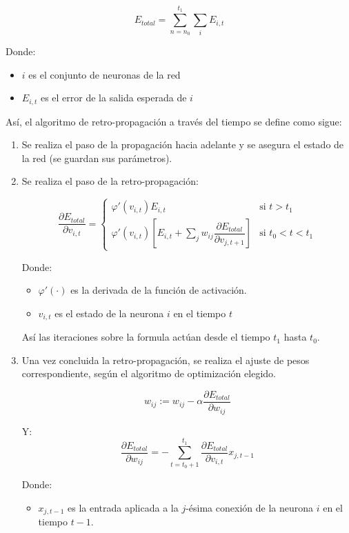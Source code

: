 \[
E_{total} = \sum^{t_1}_{n=n_0}\sum_{i}E_{i,t}
\]

Donde:
\begin{itemize}
    \item $i$ es el conjunto de neuronas de la red
    \item $E_{i,t}$ es el error de la salida esperada de $i$
\end{itemize}

Así, el algoritmo de retro-propagación a través del tiempo se define como sigue:

\begin{enumerate}
    \item Se realiza el paso de la propagación hacia adelante y se asegura el estado de la red (se guardan sus parámetros).
    \item Se realiza el paso de la retro-propagación:

    \[
    \dfrac{\partial E_{total}}{\partial v_{i,t}} = \left\{
    \begin{array}{ll}
    \varphi'(v_{i,t})E_{i,t} & \text{si } t > t_1 \\
    \varphi'(v_{i,t}) \left[E_{i,t}+\sum_{j}w_{ij}\dfrac{\partial E_{total}}{\partial v_{j,t+1}}\right] & \text{si } t_0 < t < t_1
\end{array}
\right.
    \]
    
    Donde:
    \begin{itemize}
        \item $\varphi'(\cdot)$ es la derivada de la función de activación.
        \item $v_{i,t}$ es el estado de la neurona $i$ en el tiempo $t$
    \end{itemize}

    Así las iteraciones sobre la formula actúan desde el tiempo $t_1$ hasta $t_0$.
    
    \item Una vez concluida la retro-propagación, se realiza el ajuste de pesos correspondiente, según el algoritmo de optimización elegido. 

    \[
    w_{ij} := w_{ij} - \alpha \dfrac{\partial E_{total}}{\partial w_{ij}}
    \]

    Y:
    \[
    \dfrac{\partial E_{total}}{\partial w_{ij}} = -\sum^{t_1}_{t=t_0+1}\dfrac{\partial E_{total}}{\partial v_{i,t}}x_{j,t-1}
    \]

    Donde:
    \begin{itemize}
        \item $x_{j,t-1}$ es la entrada aplicada a la $j$-ésima conexión de la neurona $i$ en el tiempo $t-1$.
    \end{itemize}
    
\end{enumerate}

